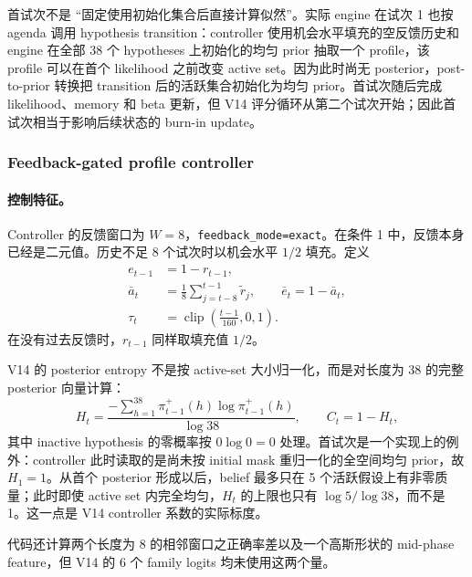 首试次不是 ``固定使用初始化集合后直接计算似然''。实际 engine 在试次 1 也按 agenda 调用 hypothesis transition：controller 使用机会水平填充的空反馈历史和 engine 在全部 38 个 hypotheses 上初始化的均匀 prior 抽取一个 profile，该 profile 可以在首个 likelihood 之前改变 active set。因为此时尚无 posterior，post-to-prior 转换把 transition 后的活跃集合初始化为均匀 prior。首试次随后完成 likelihood、memory 和 beta 更新，但 V14 评分循环从第二个试次开始；因此首试次相当于影响后续状态的 burn-in update。


\subsubsection{Feedback-gated profile controller}

\paragraph{控制特征。}
Controller 的反馈窗口为 $W=8$，\texttt{feedback\_mode=exact}。在条件 1 中，反馈本身已经是二元值。历史不足 8 个试次时以机会水平 $1/2$ 填充。定义
\begin{align}
    e_{t-1}&=1-r_{t-1},\\
    \bar a_t
    &=
    \frac{1}{8}
    \sum_{j=t-8}^{t-1}\widetilde r_j,
    \qquad
    \bar e_t=1-\bar a_t,\\
    \tau_t
    &=
    \operatorname{clip}
    \left(\frac{t-1}{160},0,1\right).
    \label{eq:modelv14-controller-history}
\end{align}
在没有过去反馈时，$r_{t-1}$ 同样取填充值 $1/2$。

V14 的 posterior entropy 不是按 active-set 大小归一化，而是对长度为 38 的完整 posterior 向量计算：
\begin{equation}
    H_t
    =
    \frac{
        -\sum_{h=1}^{38}
        \pi_{t-1}^{+}(h)
        \log\pi_{t-1}^{+}(h)
    }{
        \log38
    },
    \qquad
    C_t=1-H_t,
    \label{eq:modelv14-full-entropy}
\end{equation}
其中 inactive hypothesis 的零概率按 $0\log0=0$ 处理。首试次是一个实现上的例外：controller 此时读取的是尚未按 initial mask 重归一化的全空间均匀 prior，故 $H_1=1$。从首个 posterior 形成以后，belief 最多只在 5 个活跃假设上有非零质量；此时即使 active set 内完全均匀，$H_t$ 的上限也只有 $\log5/\log38$，而不是 1。这一点是 V14 controller 系数的实际标度。

代码还计算两个长度为 8 的相邻窗口之正确率差以及一个高斯形状的 mid-phase feature，但 V14 的 6 个 family logits 均未使用这两个量。

